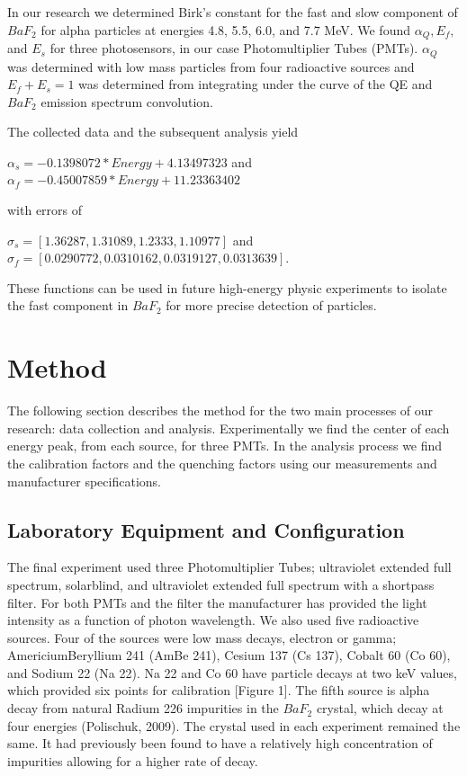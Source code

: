 \documentclass{article}
\begin{document}
In our research we determined Birk's constant for the fast and slow component of $BaF_2$ for alpha particles at energies 4.8, 5.5, 6.0, and 7.7 MeV. We found $\alpha_Q, E_f,$ and $E_s$ for three photosensors, in our case Photomultiplier Tubes (PMTs). $\alpha_Q$ was determined with low mass particles from four radioactive sources and $E_f + E_s = 1$ was determined from integrating under the curve of the QE and $BaF_2$ emission spectrum convolution. 

The collected data and the subsequent analysis yield 

\noindent
$\alpha_s = -0.1398072 * Energy + 4.13497323$ and $\alpha_f = -0.45007859 * Energy + 11.23363402$ 

with errors of 

\noindent
$\sigma_s = [1.36287, 1.31089, 1.2333, 1.10977]$ and $\sigma_f = [0.0290772, 0.0310162, 0.0319127, 0.0313639]$. 

These functions can be used in future high-energy physic experiments to isolate the fast component in $BaF_2$ for more precise detection of particles. 


\section{Method}

The following section describes the method for the two main processes of our research: data collection and analysis. Experimentally we find the center of each energy peak, from each source, for three PMTs. In the analysis process we find the calibration factors and the quenching factors using our measurements and manufacturer specifications. 

\subsection{Laboratory Equipment and Configuration}

The final experiment used three Photomultiplier Tubes; ultraviolet extended full spectrum, solarblind, and ultraviolet extended full spectrum with a shortpass filter. For both PMTs and the filter the manufacturer has provided the light intensity as a function of photon wavelength. We also used five radioactive sources. Four of the sources were low mass decays, electron or gamma; AmericiumBeryllium 241 (AmBe 241), Cesium 137 (Cs 137), Cobalt 60 (Co 60), and Sodium 22 (Na 22). Na 22 and Co 60 have particle decays at two keV values, which provided six points for calibration [Figure 1]. The fifth source is alpha decay from natural Radium 226 impurities in the $BaF_2$ crystal, which decay at four energies (Polischuk, 2009). The crystal used in each experiment remained the same. It had previously been found to have a relatively high concentration of impurities allowing for a higher rate of decay. 
\end{document}
